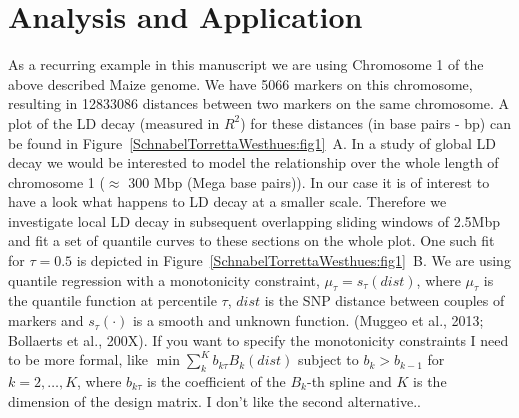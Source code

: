 \documentclass[twoside]{report}
\begin{document}

\section{Analysis and Application}

As a recurring example in this manuscript we are using Chromosome 1 of the above described 
	Maize genome. We have 5066 markers 
	on this chromosome, resulting in 12833086 distances 
	between two markers on the same chromosome. A plot of the LD decay (measured in $R^2$) 
	for these distances (in base pairs - bp) can be found 
	in Figure~\ref{SchnabelTorrettaWesthues:fig1}~A. 
	In a study of global 
	LD decay we would be interested to model the relationship over the whole length of chromosome 1
	($\approx$ 300 Mbp (Mega base pairs)). In our case it is of interest to have a look what happens to 
	LD decay at a smaller scale. Therefore we investigate local LD decay in subsequent 
	overlapping sliding windows of 2.5Mbp and fit a set of quantile curves to these 
	sections on the whole plot. One such fit for $\tau = 0.5$ is depicted 
	in Figure~\ref{SchnabelTorrettaWesthues:fig1}~B. 
	We are using quantile 
	regression with a monotonicity constraint,
	$\mu_{\tau}=s_{\tau}(dist)$, where $\mu_\tau$ is the quantile function at percentile $\tau$, $dist$ is the SNP distance between couples of markers and $s_{\tau}(\cdot)$ is a smooth and unknown function. (Muggeo et al., 2013; Bollaerts et al., 200X).
	If you want to specify the monotonicity constraints I need to be more formal, like
	$\min\sum_k^K b_{k\tau} B_k(dist)$ subject to $b_k>b_{k-1}$ for $k=2,\dots,K$, where $b_{k\tau}$ is the coefficient of the $B_k$-th spline and $K$ is the dimension of the design matrix. 
	I don't like the second alternative..
	
\end{document}
